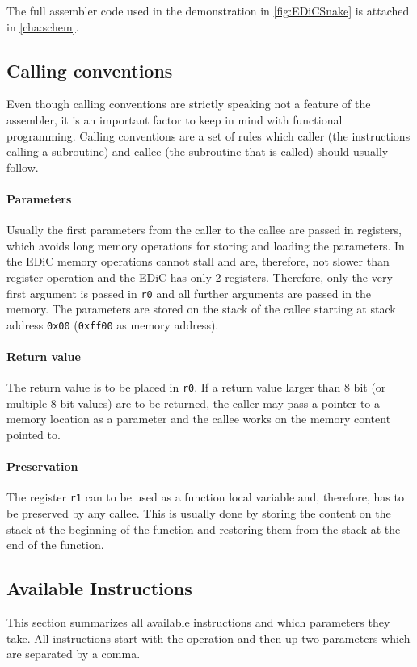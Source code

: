 The full assembler code used in the demonstration in \cref{fig:EDiCSnake} is attached in \cref{cha:schem}.

\subsection{Calling conventions}\label{sec:callingConvention}
Even though calling conventions are strictly speaking not a feature of the assembler, it is an important factor to keep in mind with functional programming.
Calling conventions are a set of rules which caller (the instructions calling a subroutine) and callee (the subroutine that is called) should usually follow.
\paragraph{Parameters}
Usually the first parameters from the caller to the callee are passed in registers, which avoids long memory operations for storing and loading the parameters.
In the \gls{EDiC} memory operations cannot stall and are, therefore, not slower than register operation and the \gls{EDiC} has only 2 registers.
Therefore, only the very first argument is passed in \texttt{r0} and all further arguments are passed in the memory.
The parameters are stored on the stack of the callee starting at stack address \texttt{0x00} (\texttt{0xff00} as memory address).
\paragraph{Return value}
The return value is to be placed in \texttt{r0}.
If a return value larger than 8 bit (or multiple 8 bit values) are to be returned, the caller may pass a pointer to a memory location as a parameter and the callee works on the memory content pointed to.
\paragraph{Preservation}
The register \texttt{r1} can to be used as a function local variable and, therefore, has to be preserved by any callee.
This is usually done by storing the content on the stack at the beginning of the function and restoring them from the stack at the end of the function.

\subsection{Available Instructions}\label{sec:asm_instr}
This section summarizes all available instructions and which parameters they take.
All instructions start with the operation and then up two parameters which are separated by a comma.

